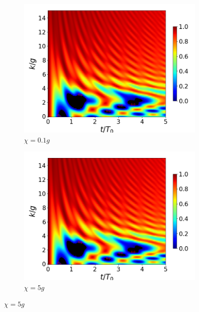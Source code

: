 \begin{figure}[h]
    \centering
    \begin{subfigure}{0.49\textwidth}
        \includegraphics[width=\textwidth]{figuras/ch4/concu/k/eg1+ge1 d=5.0g x=0.0g J=0.0g gamma=0.25g concu k dis.png}
        \caption{$\chi=0.1g$}
        \label{fig4:concu k 1 x1}
    \end{subfigure}
    \hfill
    \begin{subfigure}{0.49\textwidth}
        \includegraphics[width=\textwidth]{figuras/ch4/concu/k/eg1+ge1 d=5.0g x=0.0g J=0.0g gamma=0.25g concu k dis.png}
        \caption{$\chi=5g$}
        \label{fig4:concu k 1 x2}
    \end{subfigure}
    \vfill

\end{figure}
